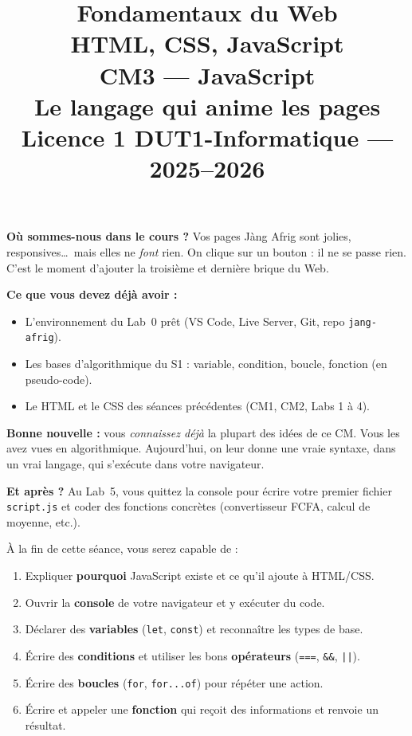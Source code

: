 \documentclass[11pt,a4paper]{article}
\title{%
\vspace{-1cm}
\textbf{\LARGE Fondamentaux du Web}\\
\textbf{\LARGE HTML, CSS, JavaScript}\\[0.8cm]
\textbf{\huge CM3 --- JavaScript}\\[0.3cm]
\textbf{\Large Le langage qui anime les pages}\\[0.5cm]
\large Licence 1 DUT1-Informatique --- 2025--2026}
\date{}
\author{}
\newcommand{\code}[1]{\texttt{#1}}
\begin{document}
\maketitle
\thispagestyle{empty}

\begin{prereqbox}
\textbf{Où sommes-nous dans le cours ?} Vos pages Jàng Afrig sont jolies, responsives\ldots\ mais elles ne \emph{font} rien. On clique sur un bouton : il ne se passe rien. C'est le moment d'ajouter la troisième et dernière brique du Web.

\smallskip
\textbf{Ce que vous devez déjà avoir :}
\begin{itemize}[leftmargin=*,noitemsep]
  \item L'environnement du Lab~0 prêt (VS Code, Live Server, Git, repo \code{jang-afrig}).
  \item Les bases d'algorithmique du S1 : variable, condition, boucle, fonction (en pseudo-code).
  \item Le HTML et le CSS des séances précédentes (CM1, CM2, Labs 1 à 4).
\end{itemize}

\smallskip
\textbf{Bonne nouvelle :} vous \emph{connaissez déjà} la plupart des idées de ce CM. Vous les avez vues en algorithmique. Aujourd'hui, on leur donne une vraie syntaxe, dans un vrai langage, qui s'exécute dans votre navigateur.

\smallskip
\textbf{Et après ?} Au Lab~5, vous quittez la console pour écrire votre premier fichier \code{script.js} et coder des fonctions concrètes (convertisseur FCFA, calcul de moyenne, etc.).
\end{prereqbox}

\begin{objectifbox}[Objectifs du CM3]
À la fin de cette séance, vous serez capable de :
\begin{enumerate}[leftmargin=*,noitemsep]
  \item Expliquer \textbf{pourquoi} JavaScript existe et ce qu'il ajoute à HTML/CSS.
  \item Ouvrir la \textbf{console} de votre navigateur et y exécuter du code.
  \item Déclarer des \textbf{variables} (\code{let}, \code{const}) et reconnaître les types de base.
  \item Écrire des \textbf{conditions} et utiliser les bons \textbf{opérateurs} (\code{===}, \code{\&\&}, \code{||}).
  \item Écrire des \textbf{boucles} (\code{for}, \code{for...of}) pour répéter une action.
  \item Écrire et appeler une \textbf{fonction} qui reçoit des informations et renvoie un résultat.
\end{enumerate}
\end{objectifbox}
\end{document}
